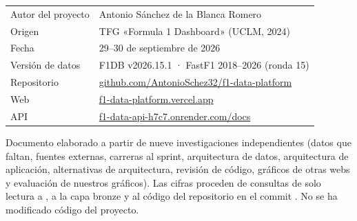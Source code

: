 \documentclass[11pt,openany]{report}
\begin{document}
\begin{titlepage}
\thispagestyle{empty}
\vspace*{7.6cm}

{\sffamily\large
\begin{tabular}{@{}ll@{}}
\textcolor{muted}{Autor del proyecto} & Antonio Sánchez de la Blanca Romero \\
\textcolor{muted}{Origen} & TFG «Formula 1 Dashboard» (UCLM, 2024) \\
\textcolor{muted}{Fecha} & 29–30 de septiembre de 2026 \\
\textcolor{muted}{Versión de datos} & F1DB v2026.15.1 · FastF1 2018–2026 (ronda 15) \\
\textcolor{muted}{Repositorio} & \href{https://github.com/AntonioSchez32/f1-data-platform}{github.com/AntonioSchez32/f1-data-platform} \\
\textcolor{muted}{Web} & \href{https://f1-data-platform.vercel.app}{f1-data-platform.vercel.app} \\
\textcolor{muted}{API} & \href{https://f1-data-api-h7c7.onrender.com/docs}{f1-data-api-h7c7.onrender.com/docs} \\
\end{tabular}}

\vfill
{\small\color{muted}
Documento elaborado a partir de nueve investigaciones independientes (datos que faltan, fuentes
externas, carreras al sprint, arquitectura de datos, arquitectura de aplicación, alternativas de
arquitectura, revisión de código, gráficos de otras webs y evaluación de nuestros gráficos). Las
cifras proceden de consultas de solo lectura a , a la capa bronze y al
código del repositorio en el commit . No se ha modificado código del proyecto.\par}
\end{titlepage}
\end{document}
